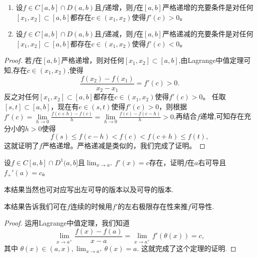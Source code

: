 \documentclass[../../main.tex]{subfiles}
\begin{document}
\begin{theorem}[严格单调和导数的关系]\label{theorem:严格单调和导数的关系}
\begin{enumerate}
\item 设\(f\in C[a,b]\cap D(a,b)\)且\(f\)递增，则\(f\)在\([a,b]\)严格递增的充要条件是对任何\([x_1,x_2]\subset [a,b]\)都存在\(c\in(x_1,x_2)\)使得\(f'(c)>0\)。

\item 设\(f\in C[a,b]\cap D(a,b)\)且\(f\)递减，则\(f\)在\([a,b]\)严格递减的充要条件是对任何\([x_1,x_2]\subset [a,b]\)都存在\(c\in(x_1,x_2)\)使得\(f'(c)<0\)。
\end{enumerate}
\end{theorem}
\begin{proof}
若\(f\)在\([a,b]\)严格递增，则对任何\([x_1,x_2]\subset [a,b]\),由Lagrange中值定理可知,存在\(c\in(x_1,x_2)\),使得
\[
\frac{f(x_2)-f(x_1)}{x_2 - x_1}=f'(c)>0.
\]
反之对任何\([x_1,x_2]\subset [a,b]\)都存在\(c\in(x_1,x_2)\)使得\(f'(c)>0\)。
任取\([s,t]\subset [a,b]\)，现在有\(c\in(s,t)\)使得\(f'(c)>0\)，则根据$f'\left( c \right) =\underset{h\rightarrow 0}{\lim}\frac{f\left( c+h \right) -f\left( c \right)}{h}=\underset{h\rightarrow 0}{\lim}\frac{f\left( c \right) -f\left( c-h \right)}{h}>0$,再结合$f$递增,可知存在充分小的\(h > 0\)使得
\[
f(s)\leqslant f(c - h)<f(c)<f(c + h)\leqslant f(t),
\]
这就证明了\(f\)严格递增。严格递减是类似的，我们完成了证明。
\end{proof}

\begin{theorem}[导数极限定理]\label{theorem:导数极限定理}
设\(f\in C[a,b]\cap D^{1}(a,b]\)且\(\lim_{x\rightarrow a^{+}}f'(x)=c\)存在，证明\(f\)在\(a\)右可导且\(f_{+}'(a)=c\)。
\end{theorem}
\begin{remark}
本结果当然也可对应写出左可导的版本以及可导的版本.
\end{remark}
\begin{note}
本结果告诉我们可在\(f\)连续的时候用\(f'\)的左右极限存在性来推\(f\)可导性.
\end{note}
\begin{proof}
运用Lagrange中值定理，我们知道
\[\lim_{x\rightarrow a^{+}}\frac{f(x)-f(a)}{x - a}=\lim_{x\rightarrow a^{+}}f'(\theta(x))=c,\]
其中
\(\theta(x)\in(a,x),\lim_{x\rightarrow a^{+}}\theta(x)=a.\)
这就完成了这个定理的证明.
\end{proof}
\end{document}
